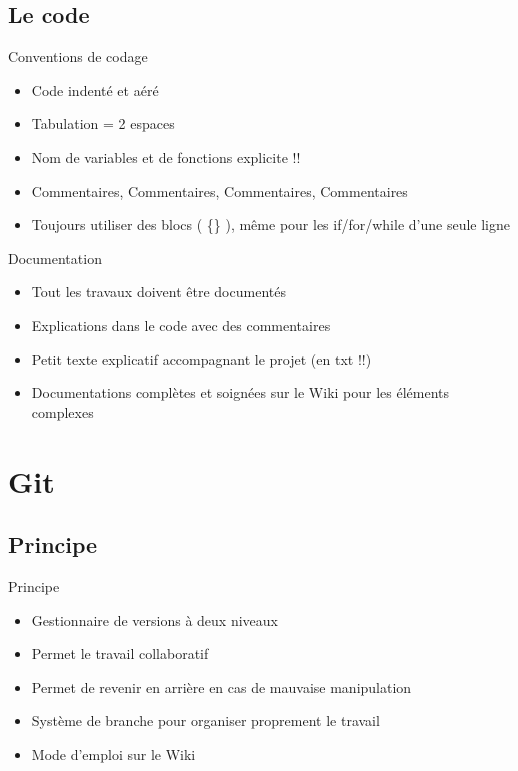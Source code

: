 \documentclass{beamer}
\begin{document}
\subsection{Le code}
\begin{frame}{Conventions de codage}
	\begin{itemize}
		\item Code indenté et aéré
		\item Tabulation = 2 espaces
		\item Nom de variables et de fonctions explicite !!
		\item Commentaires, Commentaires, Commentaires, Commentaires
		\item Toujours utiliser des blocs ( \{\} ), même pour les if/for/while d'une seule ligne
	\end{itemize}
\end{frame}

\begin{frame}{Documentation}
	\begin{itemize}
		\item Tout les travaux doivent être documentés
		\item Explications dans le code avec des commentaires
		\item Petit texte explicatif accompagnant le projet (en txt !!)
		\item Documentations complètes et soignées sur le Wiki pour les éléments complexes
	\end{itemize}
\end{frame}

\section{Git}
\subsection{Principe}
\begin{frame}{Principe}
	\begin{itemize}
		\item Gestionnaire de versions à deux niveaux
		\item Permet le travail collaboratif
		\item Permet de revenir en arrière en cas de mauvaise manipulation
		\item Système de branche pour organiser proprement le travail
		\item Mode d'emploi sur le Wiki
	\end{itemize}
\end{frame}
\end{document}
